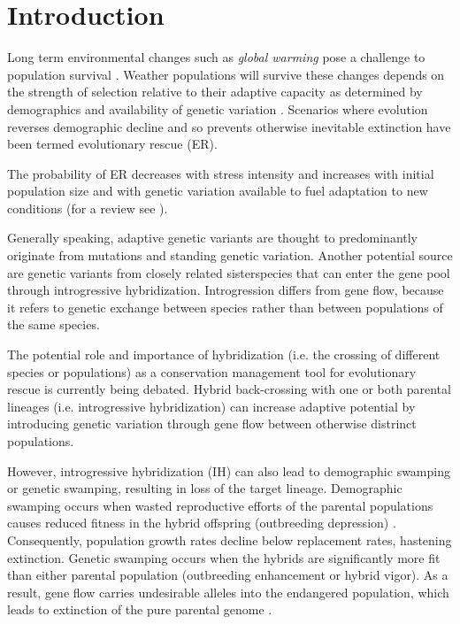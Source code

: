 \documentclass[a4paper,10pt]{article}
\begin{document}
 
\section*{Introduction}

Long term environmental changes such as \textit{global warming} pose a challenge to population survival \cite{parmesan2006ecological} \cite{hughes2000biological}. Weather populations will survive these changes depends on the strength of selection relative to their adaptive capacity as determined by demographics and availability of genetic variation \cite{lynch1993evolution} \cite{gomulkiewicz1995does} \cite{orr2008population}. Scenarios where evolution reverses demographic decline and so prevents otherwise inevitable extinction have been termed evolutionary rescue (ER). 

The probability of ER decreases with stress intensity and increases with initial population size and with genetic variation available to fuel adaptation to new conditions (for a review see \cite{bell2008adaptation}). 

Generally speaking, adaptive genetic variants are thought to predominantly originate from mutations and standing genetic variation. Another potential source are genetic variants from closely related sisterspecies that can enter the gene pool through introgressive hybridization. Introgression differs from gene flow, because it refers to genetic exchange between species rather than between populations of the same species. 

The potential role and importance of hybridization (i.e. the crossing of different species or populations) as a conservation management tool for evolutionary rescue is currently being debated. Hybrid back-crossing with one or both parental lineages (i.e. introgressive hybridization) can increase adaptive potential by introducing genetic variation through gene flow between otherwise distrinct populations.
	
However, introgressive hybridization (IH) can also lead to demographic swamping or genetic swamping, resulting in loss of the target lineage. Demographic swamping occurs when wasted reproductive efforts of the parental populations causes reduced fitness in the hybrid offspring (outbreeding depression) \cite{wolf2001predicting}. Consequently, population growth rates decline below replacement rates, hastening extinction. Genetic swamping occurs when the hybrids are significantly more fit than either parental population (outbreeding enhancement or hybrid vigor). As a result, gene flow carries undesirable alleles into the endangered population, which leads to extinction of the pure parental genome \cite{woodruff1987fifty} \cite{allendorf2001problems}. 
\end{document}
